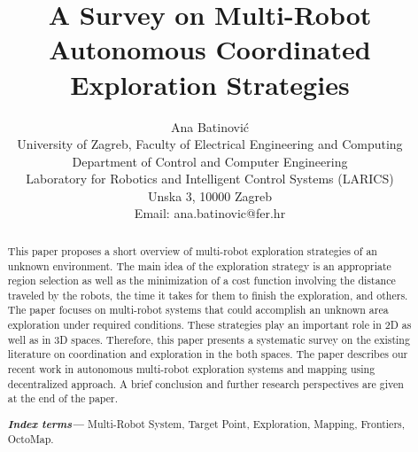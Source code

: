 \documentclass[letterpaper, 10 pt, conference]{ieeeconf}  %
\title{\LARGE \bf
	A Survey on Multi-Robot Autonomous Coordinated Exploration Strategies
}
\author{Ana Batinovi\'{c} \\
	University of Zagreb, Faculty of Electrical Engineering and Computing \\
	Department of Control and Computer Engineering\\
	Laboratory for Robotics and Intelligent Control Systems (LARICS) \\
	Unska 3, 10000 Zagreb \\
	Email: ana.batinovic@fer.hr
}
\providecommand{\indexterms}[1]{\textbf{\textit{Index terms---}} #1}
\begin{document}
\maketitle

\thispagestyle{empty}
\pagestyle{empty}


\begin{abstract}

This paper proposes a short overview of multi-robot exploration strategies of an unknown environment. The main idea of the exploration strategy is an appropriate region selection as well as the minimization of a cost function involving the distance traveled by the robots, the time it takes for them to finish the exploration, and others. The paper focuses on multi-robot systems that could accomplish an unknown area exploration under required conditions.
These strategies play an important role in 2D as well as in 3D spaces. Therefore, this paper presents a systematic survey on the existing literature on coordination and exploration in the both spaces. The paper describes our recent work in autonomous multi-robot exploration systems and mapping using decentralized approach.
A brief conclusion and further research perspectives are given at the end of the paper. 

 
\indexterms{Multi-Robot System, Target Point, Exploration, Mapping, Frontiers, OctoMap.}

\end{abstract}






%









\end{document}
